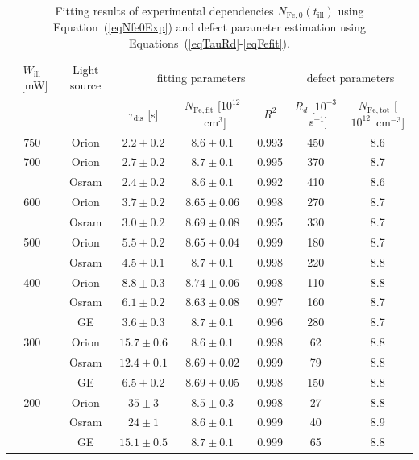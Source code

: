\documentclass{WileyMSP-template}
\begin{document}
\begin{table}
 \caption{ Fitting results of experimental dependencies $N_\mathrm{Fe,0}(t_\mathrm{ill})$ 
 using Equation~(\ref{eqNfe0Exp}) and defect parameter estimation using Equations~(\ref{eqTauRd}-\ref{eqFefit}).
}
 \label{tb1}
  \begin{tabular}[htbp]{@{}ccccccc@{}}
    \hline
    $W_\mathrm{ill}$~[mW] & Light source & \multicolumn{3}{c}{fitting parameters}&\multicolumn{2}{c}{defect parameters} \\
     &  & $\tau_\mathrm{dis}$ [s] & $N_\mathrm{Fe,fit}$ [$10^{12}$~cm$^3$] & $R^2$ & $R_d$ [$10^{-3}$~s$^{-1}$] & $N_\mathrm{Fe,tot}$ [$10^{12}$~cm$^{-3}$] \\
    \hline
    750  & Orion  & $2.2\pm0.2$ & $8.6\pm0.1$ & 0.993 &450&8.6\\
    700  & Orion  & $2.7\pm0.2$ & $8.7\pm0.1$ & 0.995 &370&8.7\\
         & Osram  & $2.4\pm0.2$ & $8.6\pm0.1$ & 0.992 &410&8.6\\
    600  & Orion  & $3.7\pm0.2$ & $8.65\pm0.06$ & 0.998&270&8.7 \\
         & Osram  & $3.0\pm0.2$ & $8.69\pm0.08$ & 0.995&330&8.7 \\
    500  & Orion  & $5.5\pm0.2$ & $8.65\pm0.04$ & 0.999&180&8.7 \\
         & Osram  & $4.5\pm0.1$ & $8.7\pm0.1$ & 0.998&220&8.8 \\
    400  & Orion  & $8.8\pm0.3$ & $8.74\pm0.06$ & 0.998&110&8.8 \\
         & Osram  & $6.1\pm0.2$ & $8.63\pm0.08$ & 0.997 &160&8.7\\
         & GE  & $3.6\pm0.3$ & $8.7\pm0.1$ & 0.996 &280&8.7\\
    300  & Orion  & $15.7\pm0.6$ & $8.6\pm0.1$ & 0.998 &62&8.8\\
         & Osram  & $12.4\pm0.1$ & $8.69\pm0.02$ & 0.999&79&8.8 \\
         & GE  & $6.5\pm0.2$ & $8.69\pm0.05$ & 0.998 &150&8.8\\
    200  & Orion  & $35\pm3$ & $8.5\pm0.3$ & 0.998 &27&8.8\\
         & Osram  & $24\pm1$ & $8.6\pm0.1$ & 0.999 &40&8.9\\
         & GE  & $15.1\pm0.5$ & $8.7\pm0.1$ & 0.999 &65&8.8\\
    \hline
  \end{tabular}
\end{table}
\end{document}
